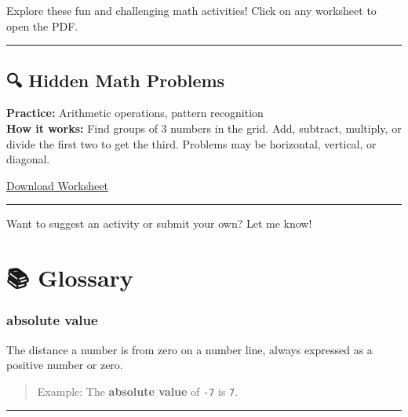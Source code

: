 \documentclass[
  letterpaper,
]{scrrept}
\begin{document}

Explore these fun and challenging math activities! Click on any
worksheet to open the PDF.

\begin{center}\rule{0.5\linewidth}{0.5pt}\end{center}

\section*{🔍 Hidden Math Problems}\label{hidden-math-problems}


\textbf{Practice:} Arithmetic operations, pattern recognition\\
\textbf{How it works:} Find groups of 3 numbers in the grid. Add,
subtract, multiply, or divide the first two to get the third. Problems
may be horizontal, vertical, or diagonal.

\href{FindTheHiddenMathProblems.pdf}{Download Worksheet}

\begin{center}\rule{0.5\linewidth}{0.5pt}\end{center}

Want to suggest an activity or submit your own? Let me know!


\chapter*{📚 Glossary}\label{glossary}


\subsection*{absolute value}\label{glossary-absolute-value}

The distance a number is from zero on a number line, always expressed as
a positive number or zero.

\begin{quote}
Example: The \textbf{absolute value} of \texttt{-7} is \texttt{7}.
\end{quote}

\begin{center}\rule{0.5\linewidth}{0.5pt}\end{center}
\end{document}
